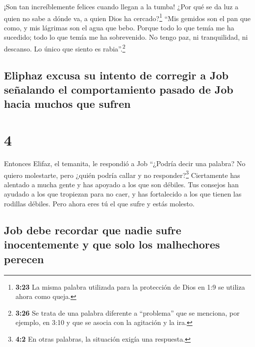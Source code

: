  ¡Son tan increíblemente felices cuando llegan a la
tumba!  ¿Por qué se da luz a quien no sabe a dónde va, a
quien Dios ha cercado?\footnote{\textbf{3:23} La misma palabra utilizada
  para la protección de Dios en 1:9 se utiliza ahora como queja.}
 ``Mis gemidos son el pan que como, y mis lágrimas son el
agua que bebo.  Porque todo lo que temía me ha sucedido;
todo lo que temía me ha sobrevenido.  No tengo paz, ni
tranquilidad, ni descanso. Lo único que siento es rabia''.\footnote{\textbf{3:26}
  Se trata de una palabra diferente a ``problema'' que se menciona, por
  ejemplo, en 3:10 y que se asocia con la agitación y la ira.}

\hypertarget{eliphaz-excusa-su-intento-de-corregir-a-job-seuxf1alando-el-comportamiento-pasado-de-job-hacia-muchos-que-sufren}{%
\subsection{Eliphaz excusa su intento de corregir a Job señalando el
comportamiento pasado de Job hacia muchos que
sufren}\label{eliphaz-excusa-su-intento-de-corregir-a-job-seuxf1alando-el-comportamiento-pasado-de-job-hacia-muchos-que-sufren}}

\hypertarget{section-3}{%
\section{4}\label{section-3}}

 Entonces Elifaz, el temanita, le respondió a Job
 ``¿Podría decir una palabra? No quiero molestarte, pero
¿quién podría callar y no responder?\footnote{\textbf{4:2} En otras
  palabras, la situación exigía una respuesta.} 
Ciertamente has alentado a mucha gente y has apoyado a los que son
débiles.  Tus consejos han ayudado a los que tropiezan
para no caer, y has fortalecido a los que tienen las rodillas débiles.
 Pero ahora eres tú el que sufre y estás molesto.

\hypertarget{job-debe-recordar-que-nadie-sufre-inocentemente-y-que-solo-los-malhechores-perecen}{%
\subsection{Job debe recordar que nadie sufre inocentemente y que solo
los malhechores
perecen}\label{job-debe-recordar-que-nadie-sufre-inocentemente-y-que-solo-los-malhechores-perecen}}

